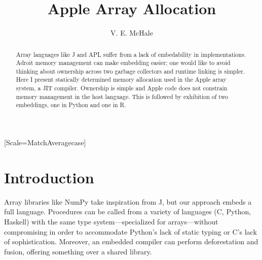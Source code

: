 \documentclass[sigplan,screen]{acmart}
\begin{document}
\setmonofont{Jet Brains Mono}[Scale=MatchAveragecase]



\begin{abstract}
    Array languages like J and APL suffer from a lack of embedability in implementations. Adroit memory management can make embedding easier; one would like to avoid thinking about ownership across two garbage collectors and runtime linking is simpler. Here I present statically determined memory allocation used in the Apple array system, a JIT compiler. Ownership is simple and Apple code does not constrain memory management in the host language. This is followed by exhibition of two embeddings, one in Python and one in R.
\end{abstract}

\title{Apple Array Allocation}
\author{V. E. McHale}
\maketitle

\section{Introduction}


Array libraries like NumPy take inspiration from J, but our approach embeds a full language. Procedures can be called from a variety of languages (C, Python, Haskell) with the same type system---specialized for arrays---without compromising in order to accommodate Python's lack of static typing or C's lack of sophistication. Moreover, an embedded compiler can perform deforestation and fusion, offering something over a shared library.

\cite{hui2020}
\end{document}
